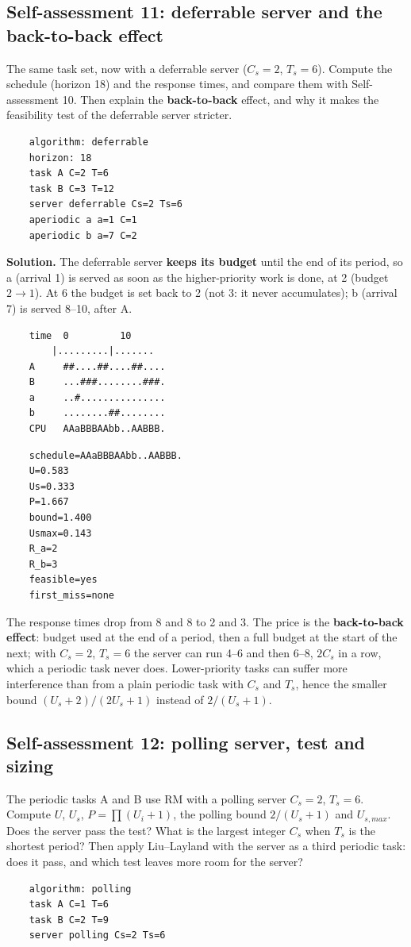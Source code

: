 \subsection*{Self-assessment 11: deferrable server and the back-to-back effect}
The same task set, now with a deferrable server ($C_s = 2$, $T_s = 6$). Compute the schedule (horizon 18) and the response times, and compare them with Self-assessment 10. Then explain the \textbf{back-to-back} effect, and why it makes the feasibility test of the deferrable server stricter.
\begin{lstlisting}
    algorithm: deferrable
    horizon: 18
    task A C=2 T=6
    task B C=3 T=12
    server deferrable Cs=2 Ts=6
    aperiodic a a=1 C=1
    aperiodic b a=7 C=2
\end{lstlisting}

\textbf{Solution.} The deferrable server \textbf{keeps its budget} until the end of its period, so a (arrival 1) is served as soon as the higher-priority work is done, at 2 (budget $2 \to 1$). At 6 the budget is set back to 2 (not 3: it never accumulates); b (arrival 7) is served 8--10, after A.
\begin{verbatim}
    time  0         10
        |.........|.......
    A     ##....##....##....
    B     ...###........###.
    a     ..#...............
    b     ........##........
    CPU   AAaBBBAAbb..AABBB.
\end{verbatim}
\begin{verbatim}
    schedule=AAaBBBAAbb..AABBB.
    U=0.583
    Us=0.333
    P=1.667
    bound=1.400
    Usmax=0.143
    R_a=2
    R_b=3
    feasible=yes
    first_miss=none
\end{verbatim}
The response times drop from 8 and 8 to 2 and 3. The price is the \textbf{back-to-back effect}: budget used at the end of a period, then a full budget at the start of the next; with $C_s = 2$, $T_s = 6$ the server can run 4--6 and then 6--8, $2C_s$ in a row, which a periodic task never does. Lower-priority tasks can suffer more interference than from a plain periodic task with $C_s$ and $T_s$, hence the smaller bound $(U_s + 2)/(2U_s + 1)$ instead of $2/(U_s + 1)$.

\subsection*{Self-assessment 12: polling server, test and sizing}
The periodic tasks A and B use RM with a polling server $C_s = 2$, $T_s = 6$. Compute $U$, $U_s$, $P = \prod (U_i + 1)$, the polling bound $2/(U_s + 1)$ and $U_{s,max}$. Does the server pass the test? What is the largest integer $C_s$ when $T_s$ is the shortest period? Then apply Liu--Layland with the server as a third periodic task: does it pass, and which test leaves more room for the server?
\begin{lstlisting}
    algorithm: polling
    task A C=1 T=6
    task B C=2 T=9
    server polling Cs=2 Ts=6
\end{lstlisting}

